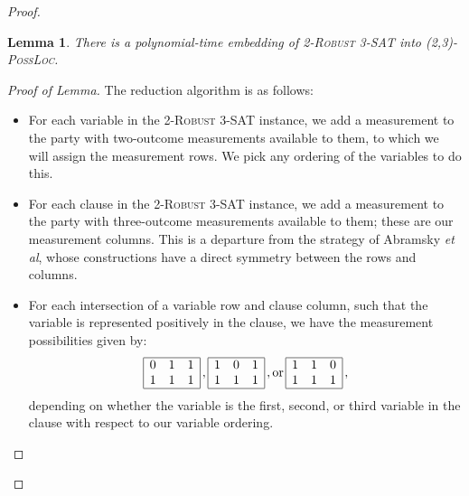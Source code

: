 \documentclass[reprint]{revtex4-1}
\newtheorem{lem}{Lemma}
\theoremstyle{definition}
\begin{document}
\begin{proof}
\begin{lem}\label{nplem}
There is a polynomial-time embedding of \textsc{2-Robust 3-SAT} into \textsc{(2,3)-PossLoc}.
\end{lem}
\begin{proof}[Proof of Lemma]
The reduction algorithm is as follows:
\begin{itemize}
\item For each variable in the \textsc{2-Robust 3-SAT} instance, we add a measurement to the party with two-outcome measurements available to them, to which we will assign the measurement rows. We pick any ordering of the variables to do this.

\item For each clause in the \textsc{2-Robust 3-SAT} instance, we add a measurement to the party with three-outcome measurements available to them; these are our measurement columns. This is a departure from the strategy of Abramsky \emph{et al}, whose constructions have a direct symmetry between the rows and columns.

\item For each intersection of a variable row and clause column, such that the variable is represented positively in the clause, we have the measurement possibilities given by:
\begin{equation}
\begin{array}{  | c c  c|}
\hline
 0 & 1 & 1 \\
 1 & 1& 1 \\ \hline
 \end{array}\, ,
 \begin{array}{  | c c  c|}
\hline
 1 &0 & 1 \\
 1 & 1& 1 \\ \hline
 \end{array} \, ,
 \mbox{or} \,
 \begin{array}{  | c c  c|}
\hline
 1 & 1 & 0\\
 1 & 1& 1 \\ \hline
 \end{array}\, ,
 \end{equation}
depending on whether the variable is the first, second, or third variable in the clause with respect to our variable ordering.


\end{itemize}
\end{proof}
\end{proof}
\end{document}
